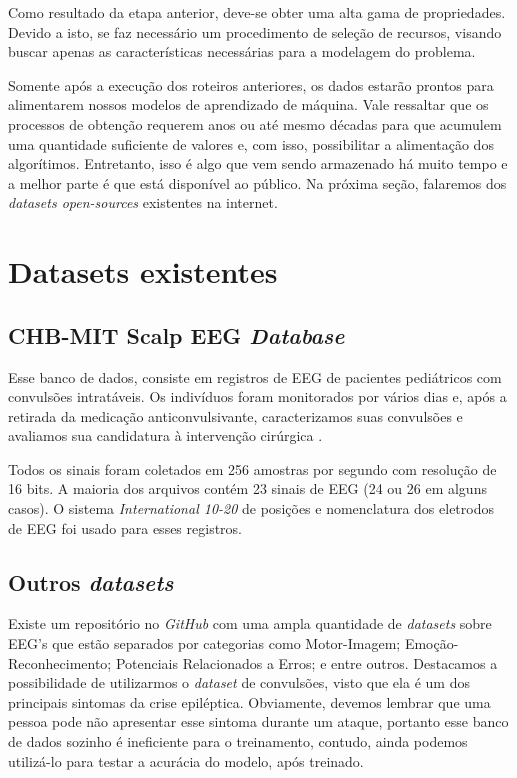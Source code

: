 Como resultado da etapa anterior, deve-se obter uma alta gama de propriedades. Devido a isto, se faz necessário um procedimento de seleção de recursos, visando buscar apenas as características necessárias para a modelagem do problema.

Somente após a execução dos roteiros anteriores, os dados estarão prontos para alimentarem nossos modelos de aprendizado de máquina. Vale ressaltar que os processos de obtenção requerem anos ou até mesmo décadas para que acumulem uma quantidade suficiente de valores e, com isso, possibilitar a alimentação dos algorítimos. Entretanto, isso é algo que vem sendo armazenado há muito tempo e a melhor parte é que está disponível ao público. Na próxima seção, falaremos dos \textit{datasets open-sources} existentes na internet.

\section{Datasets existentes}

\subsection{CHB-MIT Scalp EEG \textit{Database}}

Esse banco de dados, consiste em registros de EEG de pacientes pediátricos com convulsões intratáveis. Os indivíduos foram monitorados por vários dias e, após a retirada da medicação anticonvulsivante, caracterizamos suas convulsões e avaliamos sua candidatura à intervenção cirúrgica \cite{CHB-MIT}.

Todos os sinais foram coletados em 256 amostras por segundo com resolução de 16 bits. A maioria dos arquivos contém 23 sinais de EEG (24 ou 26 em alguns casos). O sistema \textit{International 10-20} de posições e nomenclatura dos eletrodos de EEG foi usado para esses registros.

\subsection{Outros \textit{datasets}}

Existe um repositório no \textit{GitHub} com uma ampla quantidade de \textit{datasets} sobre EEG's \cite{GITREPOSITORIO} que estão separados por categorias como Motor-Imagem; Emoção-Reconhecimento; Potenciais Relacionados a Erros; e entre outros. Destacamos a possibilidade de utilizarmos o \textit{dataset} de convulsões, visto que ela é um dos principais sintomas da crise epiléptica. Obviamente, devemos lembrar que uma pessoa pode não apresentar esse sintoma durante um ataque, portanto esse banco de dados sozinho é ineficiente para o treinamento, contudo, ainda podemos utilizá-lo para testar a acurácia do modelo, após treinado.